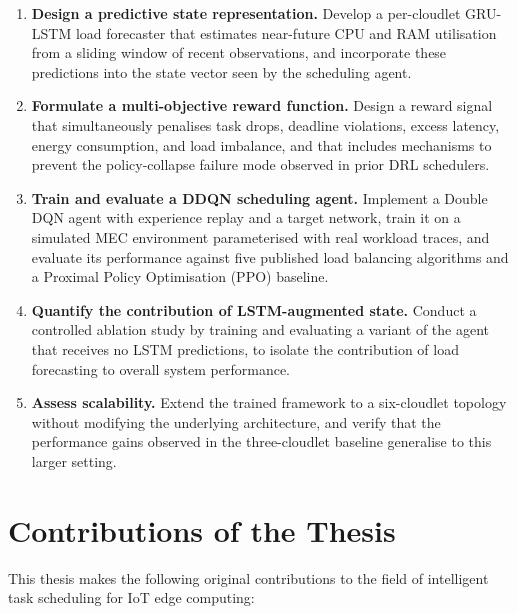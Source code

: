 \begin{enumerate}

  \item \textbf{Design a predictive state representation.}
  Develop a per-cloudlet GRU-LSTM load forecaster that estimates
  near-future CPU and RAM utilisation from a sliding window of recent
  observations, and incorporate these predictions into the state
  vector seen by the scheduling agent.

  \item \textbf{Formulate a multi-objective reward function.}
  Design a reward signal that simultaneously penalises task drops,
  deadline violations, excess latency, energy consumption, and load
  imbalance, and that includes mechanisms to prevent the
  policy-collapse failure mode observed in prior DRL schedulers.

  \item \textbf{Train and evaluate a DDQN scheduling agent.}
  Implement a Double DQN agent with experience replay and a target
  network, train it on a simulated MEC environment parameterised with
  real workload traces, and evaluate its performance against five
  published load balancing algorithms and a Proximal Policy
  Optimisation (PPO) baseline.

  \item \textbf{Quantify the contribution of LSTM-augmented state.}
  Conduct a controlled ablation study by training and evaluating a
  variant of the agent that receives no LSTM predictions, to isolate
  the contribution of load forecasting to overall system performance.

  \item \textbf{Assess scalability.}
  Extend the trained framework to a six-cloudlet topology without
  modifying the underlying architecture, and verify that the
  performance gains observed in the three-cloudlet baseline
  generalise to this larger setting.

\end{enumerate}

\section{Contributions of the Thesis}
\label{sec:contributions}

This thesis makes the following original contributions to the field of
intelligent task scheduling for IoT edge computing:

